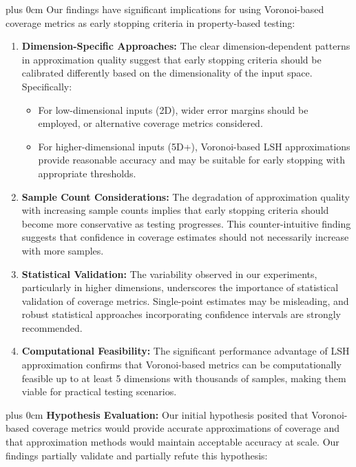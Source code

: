 \documentclass[11pt,a4paper]{article}
\newcommand{\justifytext}{\leftskip=0pt \rightskip=0pt plus 0cm}
\begin{document}
\justifytext
Our findings have significant implications for using Voronoi-based coverage metrics as early stopping criteria in property-based testing:

\begin{enumerate}
    \item \textbf{Dimension-Specific Approaches:} The clear dimension-dependent patterns in approximation quality suggest that early stopping criteria should be calibrated differently based on the dimensionality of the input space. Specifically:
    \begin{itemize}
        \item For low-dimensional inputs (2D), wider error margins should be employed, or alternative coverage metrics considered.
        \item For higher-dimensional inputs (5D+), Voronoi-based LSH approximations provide reasonable accuracy and may be suitable for early stopping with appropriate thresholds.
    \end{itemize}
    
    \item \textbf{Sample Count Considerations:} The degradation of approximation quality with increasing sample counts implies that early stopping criteria should become more conservative as testing progresses. This counter-intuitive finding suggests that confidence in coverage estimates should not necessarily increase with more samples.
    
    \item \textbf{Statistical Validation:} The variability observed in our experiments, particularly in higher dimensions, underscores the importance of statistical validation of coverage metrics. Single-point estimates may be misleading, and robust statistical approaches incorporating confidence intervals are strongly recommended.
    
    \item \textbf{Computational Feasibility:} The significant performance advantage of LSH approximation confirms that Voronoi-based metrics can be computationally feasible up to at least 5 dimensions with thousands of samples, making them viable for practical testing scenarios.
\end{enumerate}

\justifytext
\textbf{Hypothesis Evaluation:} Our initial hypothesis posited that Voronoi-based coverage metrics would provide accurate approximations of coverage and that approximation methods would maintain acceptable accuracy at scale. Our findings partially validate and partially refute this hypothesis:
\end{document}
